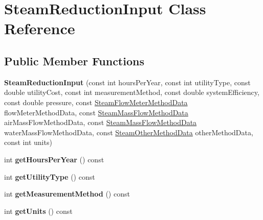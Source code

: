 \hypertarget{class_steam_reduction_input}{}\section{Steam\+Reduction\+Input Class Reference}
\label{class_steam_reduction_input}
\subsection*{Public Member Functions}
\begin{DoxyCompactItemize}
\item 
\mbox{\label{class_steam_reduction_input_a1e5233ae23531bfd3573f1dbcec7e3f1}} 
{\bfseries Steam\+Reduction\+Input} (const int hours\+Per\+Year, const int utility\+Type, const double utility\+Cost, const int measurement\+Method, const double system\+Efficiency, const double pressure, const \hyperlink{class_steam_flow_meter_method_data}{Steam\+Flow\+Meter\+Method\+Data} flow\+Meter\+Method\+Data, const \hyperlink{class_steam_mass_flow_method_data}{Steam\+Mass\+Flow\+Method\+Data} air\+Mass\+Flow\+Method\+Data, const \hyperlink{class_steam_mass_flow_method_data}{Steam\+Mass\+Flow\+Method\+Data} water\+Mass\+Flow\+Method\+Data, const \hyperlink{class_steam_other_method_data}{Steam\+Other\+Method\+Data} other\+Method\+Data, const int units)
\item 
\mbox{\label{class_steam_reduction_input_a7640e0fd2d492f225d1acc970b563d54}} 
int {\bfseries get\+Hours\+Per\+Year} () const
\item 
\mbox{\label{class_steam_reduction_input_ad60f231e29fccf4bdf6821a5adcb1adb}} 
int {\bfseries get\+Utility\+Type} () const
\item 
\mbox{\label{class_steam_reduction_input_a8e6f464d743dfe1de41b1a00f4d29636}} 
int {\bfseries get\+Measurement\+Method} () const
\item 
\mbox{\label{class_steam_reduction_input_a3826819793f0f3f71743eb095df22497}} 
int {\bfseries get\+Units} () const
\item 
\mbox{\label{class_steam_reduction_input_a758bacf2e76372745affad9acffd9129}} 

\end{DoxyCompactItemize}
